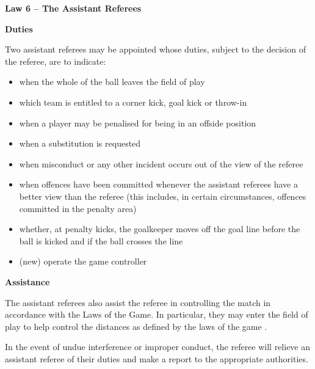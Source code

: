 \clearpage
\sffamily
{\bfseries\color[rgb]{0.4,0.4,0.4}
Law 6 -- The Assistant Referees}
{}


\bigskip

{\bfseries Duties}

\headlinebox

Two assistant referees may be appointed whose duties, subject to the decision of the referee, are to indicate:

\begin{itemize}
\item when the whole of the ball leaves the field of play
\item which team is entitled to a corner kick, goal kick or throw-in
\item when a player may be penalised for being in an offside position 
\item when a substitution is requested
\item when misconduct or any other incident occurs out of the view of the referee 
\item when offences have been committed whenever the assistant referees have a better view than the referee (this includes, in certain circumstances, offences committed in the penalty area) 
\item whether, at penalty kicks, the goalkeeper moves off the goal line before the ball is kicked and if the ball crosses the line
\item (new) operate the game controller
\end{itemize}

{\bfseries Assistance}

\headlinebox

The assistant referees also assist the referee in controlling the match in accordance with the Laws of the Game. In particular, they may enter the field of play to help control the distances as defined by the laws of the game 
.

\bigskip

In the event of undue interference or improper conduct, the referee will relieve an assistant referee of their duties and make a report to the appropriate authorities.